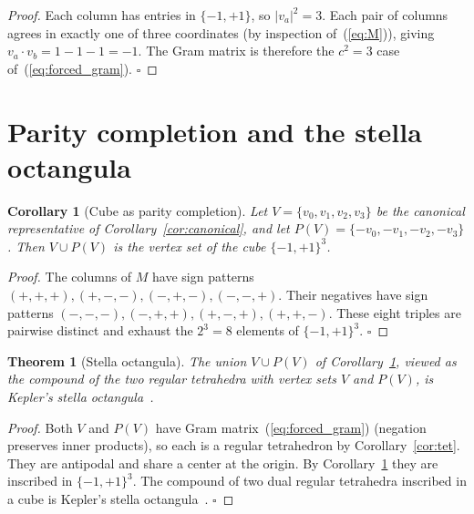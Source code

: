\documentclass[twocolumn]{iopjournal}
\newtheorem{theorem}[lemma]{Theorem}
\newtheorem{corollary}[lemma]{Corollary}
\theoremstyle{definition}
\begin{document}
\begin{proof}
Each column has entries in $\{-1,+1\}$, so $|v_a|^2 = 3$.  Each pair
of columns agrees in exactly one of three coordinates (by inspection
of~(\ref{eq:M})), giving $v_a \cdot v_b = 1 - 1 - 1 = -1$.  The
Gram matrix is therefore the $c^2 = 3$ case
of~(\ref{eq:forced_gram}).
\hfill$\square$
\end{proof}


\section*{Parity completion and the stella octangula}

\begin{corollary}[Cube as parity completion]
\label{cor:cube}
Let $V = \{v_0, v_1, v_2, v_3\}$ be the canonical representative of
Corollary~\ref{cor:canonical}, and let $P(V) = \{-v_0, -v_1, -v_2,
-v_3\}$.  Then $V \cup P(V)$ is the vertex set of the cube
$\{-1,+1\}^3$.
\end{corollary}

\begin{proof}
The columns of $M$ have sign patterns
$(+,+,+), (+,-,-), (-,+,-), (-,-,+)$.  Their negatives have sign
patterns $(-,-,-), (-,+,+), (+,-,+), (+,+,-)$.  These eight triples
are pairwise distinct and exhaust the $2^3 = 8$ elements of
$\{-1,+1\}^3$.
\hfill$\square$
\end{proof}

\begin{theorem}[Stella octangula]
\label{thm:stella}
The union $V \cup P(V)$ of Corollary~\ref{cor:cube}, viewed as the
compound of the two regular tetrahedra with vertex sets $V$ and
$P(V)$, is Kepler's stella
octangula~\cite{Kepler1619,Cromwell1997}.
\end{theorem}

\begin{proof}
Both $V$ and $P(V)$ have Gram matrix~(\ref{eq:forced_gram})
(negation preserves inner products), so each is a regular
tetrahedron by Corollary~\ref{cor:tet}.  They are antipodal and
share a center at the origin.  By Corollary~\ref{cor:cube} they are
inscribed in $\{-1,+1\}^3$.  The compound of two dual regular
tetrahedra inscribed in a cube is Kepler's stella
octangula~\cite{Kepler1619,Cromwell1997}.
\hfill$\square$
\end{proof}

\end{document}
